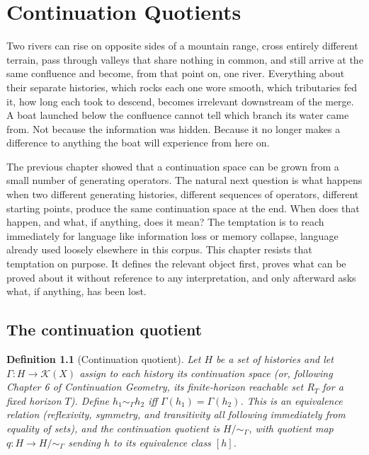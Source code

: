\documentclass[11pt]{report}
\newtheorem{definition}{Definition}[chapter]
\begin{document}
\chapter{Continuation Quotients}

Two rivers can rise on opposite sides of a mountain range, cross
entirely different terrain, pass through valleys that share nothing
in common, and still arrive at the same confluence and become, from
that point on, one river. Everything about their separate histories,
which rocks each one wore smooth, which tributaries fed it, how long
each took to descend, becomes irrelevant downstream of the merge. A
boat launched below the confluence cannot tell which branch its water
came from. Not because the information was hidden. Because it no
longer makes a difference to anything the boat will experience from
here on.

The previous chapter showed that a continuation space can be grown
from a small number of generating operators. The natural next
question is what happens when two different generating histories,
different sequences of operators, different starting points, produce
the same continuation space at the end. When does that happen, and
what, if anything, does it mean? The temptation is to reach
immediately for language like information loss or memory collapse,
language already used loosely elsewhere in this corpus. This chapter
resists that temptation on purpose. It defines the relevant object
first, proves what can be proved about it without reference to any
interpretation, and only afterward asks what, if anything, has been
lost.

\section*{The continuation quotient}

\begin{definition}[Continuation quotient]
Let $H$ be a set of histories and let $\Gamma : H \to \mathcal{K}(X)$
assign to each history its continuation space (or, following Chapter 6
of \emph{Continuation Geometry}, its finite-horizon reachable set
$R_T$ for a fixed horizon $T$). Define $h_1 \sim_\Gamma h_2$ iff
$\Gamma(h_1) = \Gamma(h_2)$. This is an equivalence relation
(reflexivity, symmetry, and transitivity all following immediately
from equality of sets), and the continuation quotient is
$H/{\sim_\Gamma}$, with quotient map $q : H \to H/{\sim_\Gamma}$
sending $h$ to its equivalence class $[h]$.
\end{definition}
\end{document}
